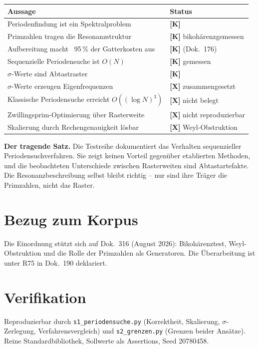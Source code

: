 \begin{center}
\begin{tabular}{ll}
\toprule
Aussage & Status \\
\midrule
Periodenfindung ist ein Spektralproblem & \textbf{[K]} \\
Primzahlen tragen die Resonanzstruktur & \textbf{[K]} bikohärenzgemessen \\
Aufbereitung macht ~95\,\% der Gatterkosten aus & \textbf{[K]} (Dok.~176) \\
Sequenzielle Periodensuche ist $O(N)$ & \textbf{[K]} gemessen \\
$\sigma$-Werte sind Abtastraster & \textbf{[K]} \\
$\sigma$-Werte erzeugen Eigenfrequenzen & \textbf{[X]} zusammengesetzt \\
Klassische Periodensuche erreicht $O((\log N)^3)$ & \textbf{[X]} nicht belegt \\
Zwillingsprim-Optimierung über Rasterweite & \textbf{[X]} nicht reproduzierbar \\
Skalierung durch Rechengenauigkeit lösbar & \textbf{[X]} Weyl-Obstruktion \\
\bottomrule
\end{tabular}
\end{center}

\textbf{Der tragende Satz.} Die Testreihe dokumentiert das Verhalten
sequenzieller Periodensuchverfahren. Sie zeigt keinen Vorteil gegenüber
etablierten Methoden, und die beobachteten Unterschiede zwischen Rasterweiten
sind Abtastartefakte. Die Resonanzbeschreibung selbst bleibt richtig -- nur
sind ihre Träger die Primzahlen, nicht das Raster.

\section{Bezug zum Korpus}

Die Einordnung stützt sich auf Dok.~316 (August 2026): Bikohärenztest,
Weyl-Obstruktion und die Rolle der Primzahlen als Generatoren. Die
Überarbeitung ist unter R75 in Dok.~190 deklariert.

\section{Verifikation}

Reproduzierbar durch \texttt{s1\_periodensuche.py} (Korrektheit,
Skalierung, $\sigma$-Zerlegung, Verfahrensvergleich) und
\texttt{s2\_grenzen.py} (Grenzen beider Ansätze). Reine
Standardbibliothek, Sollwerte als Assertions, Seed 20780458.
